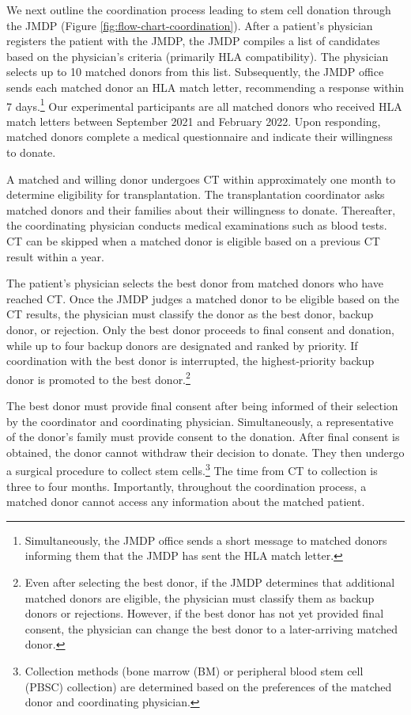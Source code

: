 \documentclass[12pt, a4paper]{article}
\begin{document}
We next outline the coordination process leading to stem cell donation through the JMDP (Figure \ref{fig:flow-chart-coordination}). After a patient's physician registers the patient with the JMDP, the JMDP compiles a list of candidates based on the physician's criteria (primarily HLA compatibility). The physician selects up to 10 matched donors from this list. Subsequently, the JMDP office sends each matched donor an HLA match letter, recommending a response within 7 days.\footnote{Simultaneously, the JMDP office sends a short message to matched donors informing them that the JMDP has sent the HLA match letter.} Our experimental participants are all matched donors who received HLA match letters between September 2021 and February 2022. Upon responding, matched donors complete a medical questionnaire and indicate their willingness to donate.

A matched and willing donor undergoes CT within approximately one month to determine eligibility for transplantation. The transplantation coordinator asks matched donors and their families about their willingness to donate. Thereafter, the coordinating physician conducts medical examinations such as blood tests. CT can be skipped when a matched donor is eligible based on a previous CT result within a year.

The patient's physician selects the best donor from matched donors who have reached CT. Once the JMDP judges a matched donor to be eligible based on the CT results, the physician must classify the donor as the best donor, backup donor, or rejection. Only the best donor proceeds to final consent and donation, while up to four backup donors are designated and ranked by priority. If coordination with the best donor is interrupted, the highest-priority backup donor is promoted to the best donor.\footnote{Even after selecting the best donor, if the JMDP determines that additional matched donors are eligible, the physician must classify them as backup donors or rejections. However, if the best donor has not yet provided final consent, the physician can change the best donor to a later-arriving matched donor.}

The best donor must provide final consent after being informed of their selection by the coordinator and coordinating physician. Simultaneously, a representative of the donor's family must provide consent to the donation. After final consent is obtained, the donor cannot withdraw their decision to donate. They then undergo a surgical procedure to collect stem cells.\footnote{Collection methods (bone marrow (BM) or peripheral blood stem cell (PBSC) collection) are determined based on the preferences of the matched donor and coordinating physician.} The time from CT to collection is three to four months. Importantly, throughout the coordination process, a matched donor cannot access any information about the matched patient.
\end{document}
